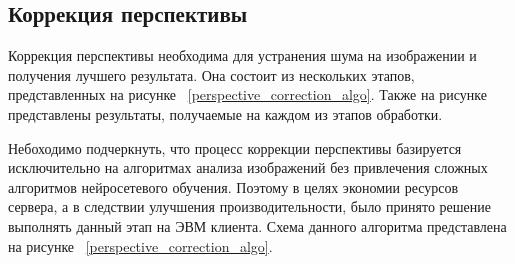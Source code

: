 \subsection{Коррекция перспективы}

Коррекция перспективы необходима для устранения шума на изображении и получения лучшего результата. Она состоит из нескольких этапов, представленных на рисунке ~\ref{perspective_correction_algo}. 
Также на рисунке представлены результаты, получаемые на каждом из этапов обработки.

Небоходимо подчеркнуть, что процесс коррекции перспективы базируется исключительно на алгоритмах анализа изображений без привлечения сложных алгоритмов нейросетевого обучения.
Поэтому в целях экономии ресурсов сервера, а в следствии улучшения производительности, было принято решение выполнять данный этап на ЭВМ клиента.
Схема данного алгоритма представлена на рисунке ~\ref{perspective_correction_algo}.
